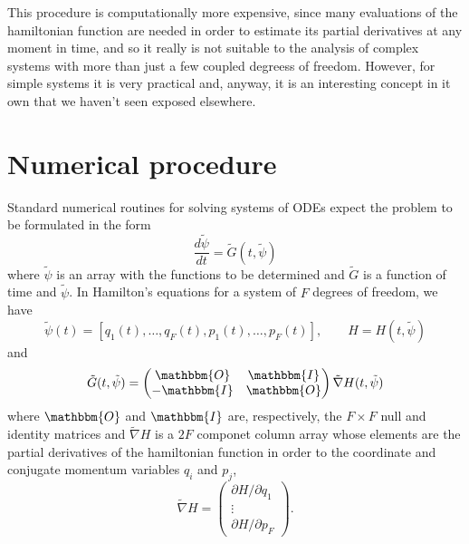 \documentclass{iopart}
\newcommand{\hmatrix}{\ensuremath{%
  \begin{pmatrix}
    \mathbbm{O}&\mathbbm{I}\\-\mathbbm{I}&\mathbbm{O}
  \end{pmatrix}
}}
\begin{document}
This procedure is computationally more expensive, since many evaluations of the
hamiltonian function are needed in order to estimate its partial derivatives at
any moment in time, and so it really is not suitable to the analysis of complex
systems with more than just a few coupled degreess of freedom. However, for
simple systems it is very practical and, anyway, it is an interesting concept in
it own that we haven't seen exposed elsewhere.

\section{Numerical procedure}
Standard numerical routines for solving systems of ODEs expect the problem to be
formulated in the form
\begin{equation}\label{eq:s_ode}
  \frac{d\tilde{\psi}}{dt}=\tilde{G}(t, \tilde{\psi})
\end{equation}
where $\tilde\psi$ is an array with the functions to be determined and $\tilde
G$ is a function of time and $\tilde\psi$. In Hamilton's equations for a system
of $F$ degrees of freedom, we have
\begin{equation}\label{eq:hpsi}
  \tilde\psi(t)=[q_1(t), \ldots, q_F(t), p_1(t), \ldots, p_F(t)],\qquad
  H=H(t,\tilde\psi)
\end{equation}
and
\begin{equation}\label{eq:heqsg}
  \tilde G(t, \tilde\psi)=
  \hmatrix
  \tilde\nabla H(t,\tilde{\psi})
\end{equation}
where $\mathbbm{O}$ and $\mathbbm{I}$ are, respectively, the $F\times F$ null
and identity matrices and $\tilde\nabla H$ is a $2F$ componet column array whose
elements are the
partial derivatives of the hamiltonian function in order to the coordinate and 
conjugate momentum variables $q_i$ and $p_j$,
\begin{equation}
  \tilde\nabla H = 
  \begin{pmatrix}
    \partial H/\partial q_1\\
    \vdots\\
    \partial H/\partial p_F
  \end{pmatrix}.
\end{equation}
\end{document}
